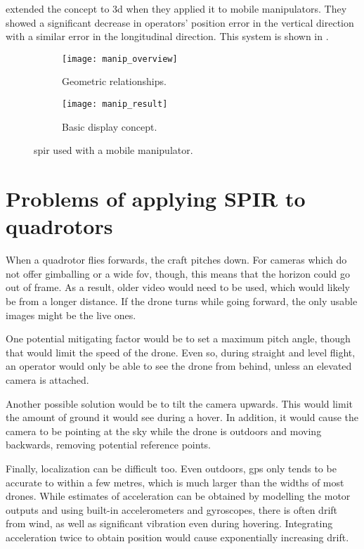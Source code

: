     \textcite{murata2014} extended the concept to \gls{3d} when they applied it to mobile manipulators.
    They showed a significant decrease in operators' position error in the vertical direction with a similar error in the longitudinal direction.
    This system is shown in .

    \begin{figure}[h]
      \centering
      \begin{subfigure}[b]{0.45\textwidth}
	\texttt{[image: manip\_overview]}
	\caption{Geometric relationships.}
	\label{fig:manip_overview_background}
      \end{subfigure}
      \hfill
      \begin{subfigure}[b]{0.45\textwidth}
	\texttt{[image: manip\_result]}
	\caption{Basic display concept.}
      \end{subfigure}
      \caption[\acrshort{spir} with mobile manipulator]{\gls{spir} used with a mobile manipulator.\cite{murata2014}}
      \label{fig:manip_results}
    \end{figure}

\section{Problems of applying SPIR to quadrotors}
  When a quadrotor flies forwards, the craft pitches down.
  For cameras which do not offer gimballing or a wide \gls{fov}, though, this means that the horizon could go out of frame.
  As a result, older video would need to be used, which would likely be from a longer distance.
  If the drone turns while going forward, the only usable images might be the live ones.

  One potential mitigating factor would be to set a maximum pitch angle, though that would limit the speed of the drone.
  Even so, during straight and level flight, an operator would only be able to see the drone from behind, unless an elevated camera is attached.

  Another possible solution would be to tilt the camera upwards.
  This would limit the amount of ground it would see during a hover.
  In addition, it would cause the camera to be pointing at the sky while the drone is outdoors and moving backwards, removing potential reference points.

  Finally, localization can be difficult too.
  Even outdoors, \gls{gps} only tends to be accurate to within a few metres, which is much larger than the widths of most drones.
  While estimates of acceleration can be obtained by modelling the motor outputs and using built-in accelerometers and gyroscopes, there is often drift from wind, as well as significant vibration even during hovering.
  Integrating acceleration twice to obtain position would cause exponentially increasing drift.

